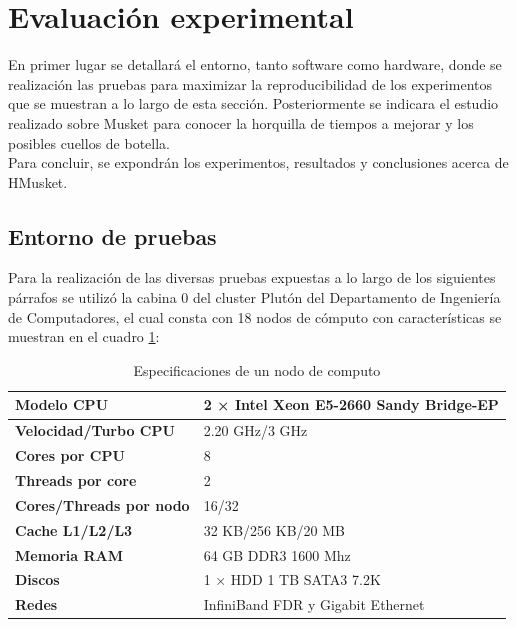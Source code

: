 \documentclass[conference]{IEEEtran}
\begin{document}
\section{Evaluación experimental}
En primer lugar se detallará el entorno, tanto software como hardware, donde se realización las pruebas para maximizar la reproducibilidad de los experimentos que se muestran a lo largo de esta sección. Posteriormente se indicara el estudio realizado sobre Musket para conocer la horquilla de tiempos a mejorar y los posibles cuellos de botella.\\
Para concluir, se expondrán los experimentos, resultados y conclusiones acerca de HMusket.

\subsection{Entorno de pruebas}
Para la realización de las diversas pruebas expuestas a lo largo de los siguientes párrafos se utilizó la cabina 0 del cluster Plutón del Departamento de Ingeniería de Computadores, el cual consta con 18 nodos de cómputo con características se muestran en el cuadro \ref{node_especification}:\\ 

\begin{table}[t]
	\begin{center}
		\begin{tabular}{|l|l|}
			\hline
			\textbf{Modelo CPU} & 2 × Intel Xeon E5-2660 Sandy Bridge-EP \\ \hline
			\textbf{Velocidad/Turbo CPU} & 2.20 GHz/3 GHz \\ \hline
			\textbf{Cores por CPU} & 8 \\ \hline
			\textbf{Threads por core} & 2 \\ \hline
			\textbf{Cores/Threads por nodo} & 16/32 \\ \hline
			\textbf{Cache L1/L2/L3} & 32 KB/256 KB/20 MB \\ \hline
			\textbf{Memoria RAM} & 64 GB DDR3 1600 Mhz \\ \hline
			\textbf{Discos} & 1 × HDD 1 TB SATA3 7.2K \\ \hline
			\textbf{Redes} & InfiniBand FDR y Gigabit Ethernet \\ \hline
		\end{tabular}
		\caption{Especificaciones de un nodo de computo}
		\label{node_especification}
	\end{center}
\end{table}
\end{document}
